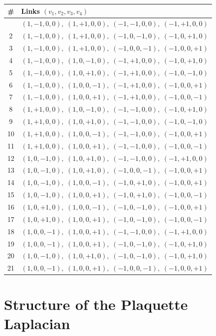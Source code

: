 \documentclass[12pt, a4paper]{article}
\theoremstyle{plain}
\theoremstyle{definition}
\theoremstyle{remark}
\begin{document}
\begin{longtable}{cl}
\toprule
\# & Links $(v_1, v_2, v_3, v_4)$\\
\midrule
\endhead
\bottomrule
\endfoot
1  & $(1,-1,0,0),\;(1,+1,0,0),\;(-1,-1,0,0),\;(-1,+1,0,0)$\\
2  & $(1,-1,0,0),\;(1,+1,0,0),\;(-1,0,-1,0),\;(-1,0,+1,0)$\\
3  & $(1,-1,0,0),\;(1,+1,0,0),\;(-1,0,0,-1),\;(-1,0,0,+1)$\\
4  & $(1,-1,0,0),\;(1,0,-1,0),\;(-1,+1,0,0),\;(-1,0,+1,0)$\\
5  & $(1,-1,0,0),\;(1,0,+1,0),\;(-1,+1,0,0),\;(-1,0,-1,0)$\\
6  & $(1,-1,0,0),\;(1,0,0,-1),\;(-1,+1,0,0),\;(-1,0,0,+1)$\\
7  & $(1,-1,0,0),\;(1,0,0,+1),\;(-1,+1,0,0),\;(-1,0,0,-1)$\\
8  & $(1,+1,0,0),\;(1,0,-1,0),\;(-1,-1,0,0),\;(-1,0,+1,0)$\\
9  & $(1,+1,0,0),\;(1,0,+1,0),\;(-1,-1,0,0),\;(-1,0,-1,0)$\\
10 & $(1,+1,0,0),\;(1,0,0,-1),\;(-1,-1,0,0),\;(-1,0,0,+1)$\\
11 & $(1,+1,0,0),\;(1,0,0,+1),\;(-1,-1,0,0),\;(-1,0,0,-1)$\\
12 & $(1,0,-1,0),\;(1,0,+1,0),\;(-1,-1,0,0),\;(-1,+1,0,0)$\\
13 & $(1,0,-1,0),\;(1,0,+1,0),\;(-1,0,0,-1),\;(-1,0,0,+1)$\\
14 & $(1,0,-1,0),\;(1,0,0,-1),\;(-1,0,+1,0),\;(-1,0,0,+1)$\\
15 & $(1,0,-1,0),\;(1,0,0,+1),\;(-1,0,+1,0),\;(-1,0,0,-1)$\\
16 & $(1,0,+1,0),\;(1,0,0,-1),\;(-1,0,-1,0),\;(-1,0,0,+1)$\\
17 & $(1,0,+1,0),\;(1,0,0,+1),\;(-1,0,-1,0),\;(-1,0,0,-1)$\\
18 & $(1,0,0,-1),\;(1,0,0,+1),\;(-1,-1,0,0),\;(-1,+1,0,0)$\\
19 & $(1,0,0,-1),\;(1,0,0,+1),\;(-1,0,-1,0),\;(-1,0,+1,0)$\\
20 & $(1,0,-1,0),\;(1,0,+1,0),\;(-1,0,-1,0),\;(-1,0,+1,0)$\\
21 & $(1,0,0,-1),\;(1,0,0,+1),\;(-1,0,0,-1),\;(-1,0,0,+1)$\\
\end{longtable}

\section{Structure of the Plaquette Laplacian}\label{app:Kmat}
\end{document}
